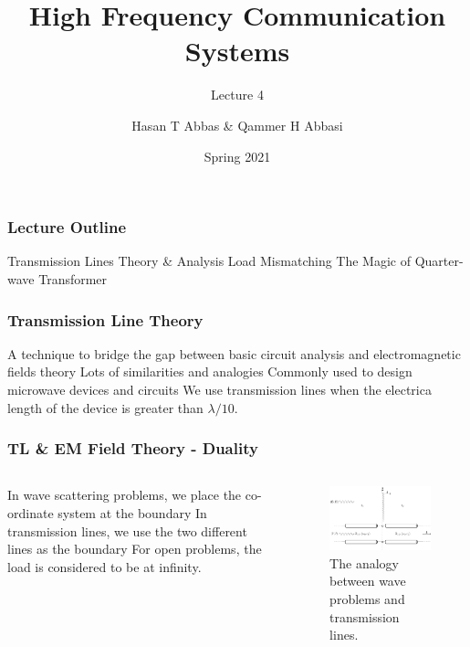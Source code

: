 \documentclass[10pt, compress]{beamer}
\title{High Frequency Communication Systems}
\subtitle{Lecture 4}
\date{Spring 2021}
\author{Hasan T Abbas \& Qammer H Abbasi}
\begin{document}
\maketitle

\begin{frame}[fragile]
  \frametitle{Lecture Outline}
\begin{outline}[itemize]
  \1 Transmission Lines Theory \& Analysis
  \1 Load Mismatching
  \1 The Magic of Quarter-wave Transformer
\end{outline}
\end{frame}
\begin{frame}[fragile]
\frametitle{Transmission Line Theory}
\begin{outline}
  \1 A technique to bridge the gap between basic circuit analysis and electromagnetic fields theory
   \2 Lots of similarities and analogies
    \1 Commonly used to design microwave devices and circuits
    \1 We use transmission lines when the electrica length of the device is greater than $\lambda / 10$.
\end{outline}
\end{frame}

\begin{frame}
  \frametitle{TL \& EM Field Theory - Duality}
  \begin{columns}[T] %
  \begin{column}{.3\textwidth}
\begin{outline}
  \1 In wave scattering problems, we place the co-ordinate system at the boundary
  \1 In transmission lines, we use the two different lines as the boundary
  \1 For open problems, the load is considered to be at infinity.
  \end{outline}
   \end{column}
 \begin{column}[T]{.7\textwidth}
    \begin{figure}
      \centering
          \includegraphics[width=.9\textwidth]{circuit.pdf}
      \caption{The analogy between wave problems and transmission lines.}
    \end{figure}
      \end{column}%
\end{columns}
  \end{frame}
\end{document}
